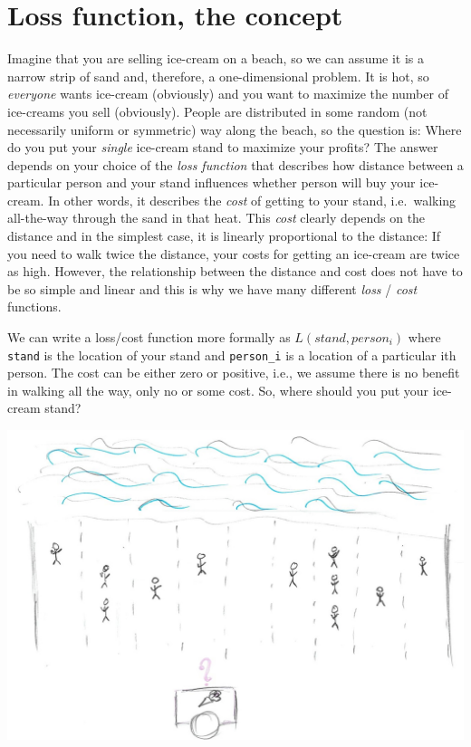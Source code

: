 \documentclass[
]{book}
\begin{document}
\hypertarget{loss-function-the-concept}{%
\section{Loss function, the concept}\label{loss-function-the-concept}}

Imagine that you are selling ice-cream on a beach, so we can assume it is a narrow strip of sand and, therefore, a one-dimensional problem. It is hot, so \emph{everyone} wants ice-cream (obviously) and you want to maximize the number of ice-creams you sell (obviously). People are distributed in some random (not necessarily uniform or symmetric) way along the beach, so the question is: Where do you put your \emph{single} ice-cream stand to maximize your profits? The answer depends on your choice of the \emph{loss function} that describes how distance between a particular person and your stand influences whether person will buy your ice-cream. In other words, it describes the \emph{cost} of getting to your stand, i.e.~walking all-the-way through the sand in that heat. This \emph{cost} clearly depends on the distance and in the simplest case, it is linearly proportional to the distance: If you need to walk twice the distance, your costs for getting an ice-cream are twice as high. However, the relationship between the distance and cost does not have to be so simple and linear and this is why we have many different \emph{loss} / \emph{cost} functions.

We can write a loss/cost function more formally as \(L(stand, person_i)\) where \texttt{stand} is the location of your stand and \texttt{person\_i} is a location of a particular ith person. The cost can be either zero or positive, i.e., we assume there is no benefit in walking all the way, only no or some cost. So, where should you put your ice-cream stand?

\begin{center}\includegraphics[width=1\linewidth]{images/loss-functions-where-to} \end{center}
\end{document}

